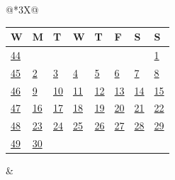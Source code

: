 \begin{tabularx}{\linewidth}{@{}*{3}{X}@{}}
{{\begin{tabularx}{\linewidth}{Y|*{7}{Y}}
  W & M & T & W & T & F & S & S \\ \hline
  \hyperlink{Week 44}{44} &&&&&&&\hyperlink{Week 44}{\textcolor{red!70!black}{1}}\\ 
  \hyperlink{Week 45}{45} &\hyperlink{Week 45}{2}&\hyperlink{Week 45}{3}&\hyperlink{Week 45}{4}&\hyperlink{Week 45}{5}&\hyperlink{Week 45}{6}&\hyperlink{Week 45}{\textcolor{gray!60!black}{7}}&\hyperlink{Week 45}{\textcolor{red!70!black}{8}}\\ 
  \hyperlink{Week 46}{46} &\hyperlink{Week 46}{9}&\hyperlink{Week 46}{10}&\hyperlink{Week 46}{11}&\hyperlink{Week 46}{12}&\hyperlink{Week 46}{13}&\hyperlink{Week 46}{\textcolor{gray!60!black}{14}}&\hyperlink{Week 46}{\textcolor{red!70!black}{15}}\\ 
  \hyperlink{Week 47}{47} &\hyperlink{Week 47}{16}&\hyperlink{Week 47}{17}&\hyperlink{Week 47}{18}&\hyperlink{Week 47}{19}&\hyperlink{Week 47}{20}&\hyperlink{Week 47}{\textcolor{gray!60!black}{21}}&\hyperlink{Week 47}{\textcolor{red!70!black}{22}}\\ 
  \hyperlink{Week 48}{48} &\hyperlink{Week 48}{23}&\hyperlink{Week 48}{24}&\hyperlink{Week 48}{25}&\hyperlink{Week 48}{26}&\hyperlink{Week 48}{27}&\hyperlink{Week 48}{\textcolor{gray!60!black}{28}}&\hyperlink{Week 48}{\textcolor{red!70!black}{29}}\\ 
  \hyperlink{Week 49}{49} &\hyperlink{Week 49}{30}&&&&&&\\ 
  \end{tabularx}}
} & 
\end{tabularx}
